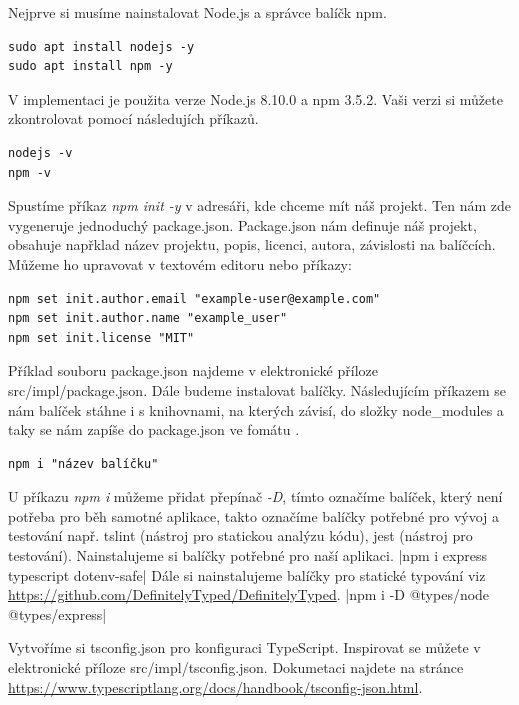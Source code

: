 \documentclass[thesis=B,czech]{FITthesis}[2012/06/26]
\begin{document}
        Nejprve si musíme nainstalovat Node.js a správce balíčk npm.
        \begin{verbatim}
sudo apt install nodejs -y
sudo apt install npm -y
    \end{verbatim}
        V implementaci je použita verze Node.js 8.10.0 a npm 3.5.2. Vaši verzi si můžete zkontrolovat pomocí následujích příkazů.
        \begin{verbatim}
nodejs -v
npm -v
        \end{verbatim}
        Spustíme příkaz \textit{npm init -y} v adresáři, kde chceme mít náš projekt. Ten nám zde vygeneruje jednoduchý package.json. Package.json nám definuje náš projekt, obsahuje napřklad název projektu, popis, licenci, autora, závislosti na balíčcích. Můžeme ho upravovat v textovém editoru nebo příkazy:
        \begin{verbatim}
npm set init.author.email "example-user@example.com"
npm set init.author.name "example_user"
npm set init.license "MIT"
        \end{verbatim}
        Příklad souboru package.json najdeme v elektronické příloze src/impl/package.json.
        Dále budeme instalovat balíčky. Následujícím příkazem se nám balíček stáhne i s knihovnami, na kterých závisí, do složky node\_modules a taky se nám zapíše do package.json ve fomátu . 
        \begin{verbatim}
npm i "název balíčku"
        \end{verbatim}
        U příkazu \textit{npm i} můžeme přidat přepínač \textit{-D}, tímto označíme balíček, který není potřeba pro běh samotné aplikace, takto označíme balíčky potřebné pro vývoj a testování např. tslint (nástroj pro statickou analýzu kódu), jest (nástroj pro testování).
        Nainstalujeme si balíčky potřebné pro naší aplikaci.
        |npm i express typescript dotenv-safe|
        Dále si nainstalujeme balíčky pro statické typování viz \url{https://github.com/DefinitelyTyped/DefinitelyTyped}.
        |npm i -D @types/node @types/express|
    
        Vytvoříme si tsconfig.json pro konfiguraci TypeScript. Inspirovat se můžete v elektronické příloze src/impl/tsconfig.json. Dokumetaci najdete na stránce \url{https://www.typescriptlang.org/docs/handbook/tsconfig-json.html}.
\end{document}
